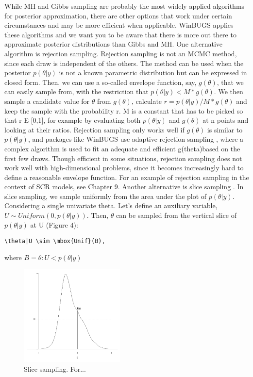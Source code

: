 While MH and Gibbs sampling are probably the most widely applied algorithms for posterior approximation, there are other options that work under certain circumstances and may be more efficient when applicable. WinBUGS applies these algorithms and we want you to be aware that there is more out there to approximate posterior distributions than Gibbs and MH.
One alternative algorithm is rejection sampling. Rejection sampling is not an MCMC method, since each draw is independent of the others. The method can be used when the posterior $p(\theta|y)$ is not a known parametric distribution but can be expressed in closed form. Then, we can use a so-called envelope function, say, $g(\theta)$, that we can easily sample from, with the restriction that $p(\theta|y) < M * g(\theta)$. We then sample a candidate value for $\theta$ from $g(\theta)$, calculate $r = p(\theta|y)/M*g(\theta)$ and keep the sample with the probability r. M is a constant that has to be picked so that r E [0,1], for example by evaluating both $p(\theta|y)$ and $g(\theta)$ at n points and looking at their ratios. Rejection sampling only works well if $g(\theta)$ is similar to $p(\theta|y)$, and packages like WinBUGS use adaptive rejection sampling \citep{gilks_wild:1992}, where a complex algorithm is used to fit an adequate and efficient g(theta)based on the first few draws. Though efficient in some situations, rejection sampling does not work well with high-dimensional problems, since it becomes increasingly hard to define a reasonable envelope function. For an example of rejection sampling in the context of SCR models, see Chapter 9.
Another alternative is slice sampling \citep{neal:2003}. In slice sampling, we sample uniformly from the area under the plot of $p(\theta|y)$. Considering a single univariate theta. Let's define an auxiliary variable, $U \sim  Uniform(0, p(\theta|y))$. Then, $\theta$ can be sampled from the vertical slice of $p(\theta|y)$ at U (Figure 4):

\begin{verbatim}
\theta|U \sim \mbox{Unif}(B),
\end{verbatim}
where $B = {\theta: U < p(\theta|y)}$


\begin{figure}
\begin{center}
\includegraphics[height=2in]{Ch6/figs/slicesampling}
\end{center}
\caption{Slice sampling. For...}
\label{slicesample.fig}
\end{figure}

